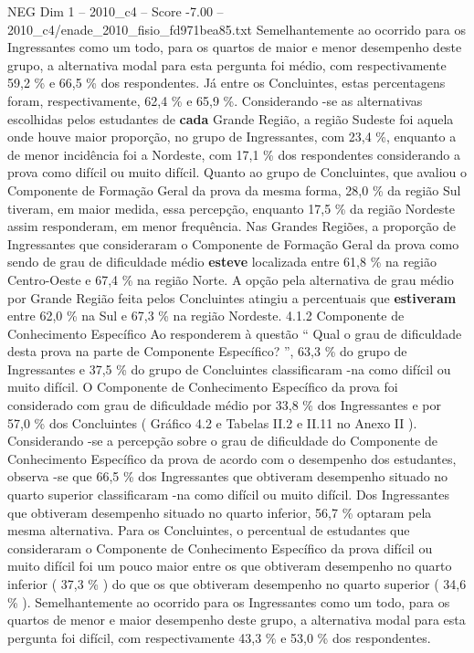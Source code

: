 \begin{textsample}{NEG Dim 1 – 2010\_c4 – Score -7.00 – 2010\_c4/enade\_2010\_fisio\_fd971bea85.txt}
Semelhantemente ao ocorrido para os Ingressantes como um todo, para os quartos de maior e menor desempenho deste grupo, a alternativa modal para esta pergunta foi médio, com respectivamente 59,2 \% e 66,5 \% dos respondentes.
Já entre os Concluintes, estas percentagens foram, respectivamente, 62,4 \% e 65,9 \%.
Considerando -se as alternativas escolhidas pelos estudantes de \textbf{cada} Grande Região, a região Sudeste foi aquela onde houve maior proporção, no grupo de Ingressantes, com 23,4 \%, enquanto a de menor incidência foi a Nordeste, com 17,1 \% dos respondentes considerando a prova como difícil ou muito difícil.
Quanto ao grupo de Concluintes, que avaliou o Componente de Formação Geral da prova da mesma forma, 28,0 \% da região Sul tiveram, em maior medida, essa percepção, enquanto 17,5 \% da região Nordeste assim responderam, em menor frequência.
Nas Grandes Regiões, a proporção de Ingressantes que consideraram o Componente de Formação Geral da prova como sendo de grau de dificuldade médio \textbf{esteve} localizada entre 61,8 \% na região Centro-Oeste e 67,4 \% na região Norte.
A opção pela alternativa de grau médio por Grande Região feita pelos Concluintes atingiu a percentuais que \textbf{estiveram} entre 62,0 \% na Sul e 67,3 \% na região Nordeste. 4.1.2 Componente de Conhecimento Específico Ao responderem à questão “ Qual o grau de dificuldade desta prova na parte de Componente Específico? ”, 63,3 \% do grupo de Ingressantes e 37,5 \% do grupo de Concluintes classificaram -na como difícil ou muito difícil.
O Componente de Conhecimento Específico da prova foi considerado com grau de dificuldade médio por 33,8 \% dos Ingressantes e por 57,0 \% dos Concluintes ( Gráfico 4.2 e Tabelas II.2 e II.11 no Anexo II ).
Considerando -se a percepção sobre o grau de dificuldade do Componente de Conhecimento Específico da prova de acordo com o desempenho dos estudantes, observa -se que 66,5 \% dos Ingressantes que obtiveram desempenho situado no quarto superior classificaram -na como difícil ou muito difícil.
Dos Ingressantes que obtiveram desempenho situado no quarto inferior, 56,7 \% optaram pela mesma alternativa.
Para os Concluintes, o percentual de estudantes que consideraram o Componente de Conhecimento Específico da prova difícil ou muito difícil foi um pouco maior entre os que obtiveram desempenho no quarto inferior ( 37,3 \% ) do que os que obtiveram desempenho no quarto superior ( 34,6 \% ).
Semelhantemente ao ocorrido para os Ingressantes como um todo, para os quartos de menor e maior desempenho deste grupo, a alternativa modal para esta pergunta foi difícil, com respectivamente 43,3 \% e 53,0 \% dos respondentes.

\end{textsample}
